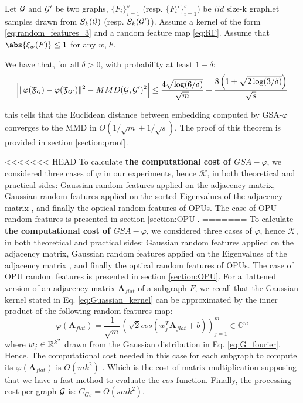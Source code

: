 \begin{theorem}
\label{theorem:concentration}
Let $\mathcal{G}$ and $\mathcal{G}'$ be two graphs, $\{F_i\}_{i=1}^{s}$ (resp. $\{F_i'\}_{i=1}^{s}$) be $iid$ size-k graphlet samples drawn from $S_k(\mathcal{G})$ (resp. $S_k(\mathcal{G}')$). Assume a kernel of the form \eqref{eq:random_features_3} and a random feature map \eqref{eq:RF}. Assume that $\abs{\xi_w(F)} \leq 1$ for any $w,F$.

We have that, for all $\delta>0$, with probability at least $1-\delta$:
\begin{align*}
 \Big|\|\varphi(\mathfrak{F}_{\mathcal{G}}) - \varphi(\mathfrak{F}_{\mathcal{G}'})\|^2 - MMD(\mathcal{G},\mathcal{G}')^2 \Big| \leq \frac{4 \sqrt{\log (6/\delta)}}{\sqrt{m}} + \frac{8\left(1+\sqrt{2\log(3/\delta)}\right)}{\sqrt{{s}}}
\end{align*}
\end{theorem}
this tells that the Euclidean distance between embedding computed by GSA-$\varphi$ converges to the MMD in $O(1/\sqrt{m} + 1/\sqrt{s})$. The proof of this theorem is provided in section \ref{section:proof}.

<<<<<<< HEAD
To calculate \textbf{the computational cost of $GSA-\varphi$}, we considered three cases of $\varphi$ in our experiments, hence $\mathcal{K}$, in both theoretical and practical sides: Gaussian random features applied on the adjacency matrix, Gaussian random features applied on the sorted Eigenvalues of the adjacency matrix , and finally the optical random features of OPUs. The case of OPU random features is presented in section \ref{section:OPU}.\newline
{}
=======
To calculate \textbf{the computational cost of $GSA-\varphi$}, we considered three cases of $\varphi$, hence $\mathcal{K}$, in both theoretical and practical sides: Gaussian random features applied on the adjacency matrix, Gaussian random features applied on the Eigenvalues of the adjacency matrix , and finally the optical random features of OPUs. The case of OPU random features is presented in section \ref{section:OPU}.\newline
For a flattened version of an adjacency matrix $\mathbf{A}_{flat}$ of a subgraph $F$, we recall that the Gaussian kernel stated in Eq. \ref{eq:Guassian_kernel} can be approximated by the inner product of the following random features map:
\[
\varphi(\mathbf{A}_{flat}) = \frac{1}{\sqrt{m}} ( \sqrt{2}cos(w_j^T\mathbf{A}_{flat}+b) )_{j=1}^m \in \mathbb{C}^m
\]
where $w_j\in\mathbb{R}^{k^2}$ drawn from the Gaussian distribution in Eq. \ref{eq:G_fourier}. Hence, The computational cost needed in this case for each subgraph to compute its $\varphi(\mathbf{A}_{flat})$ is $O(mk^2)$ . Which is the cost of matrix multiplication supposing that we have a fast method to evaluate the $cos$ function. Finally, the processing cost per graph $\mathcal{G}$ is: $C_{Gs}=O(smk^2)$.

